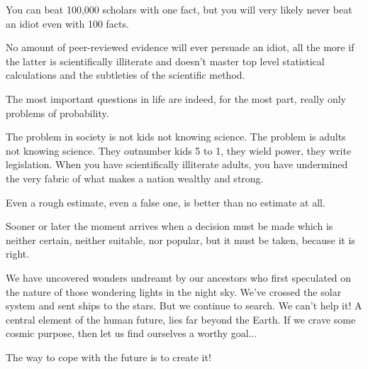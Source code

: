  	\begin{fuquote}[?]You can beat 100,000 scholars with one fact, but you will very likely never beat an idiot even with 100 facts.
 	\end{fuquote}
 	
 	\begin{fuquote}[?]No amount of peer-reviewed evidence will ever persuade an idiot, all the more if the latter is scientifically illiterate and doesn't master top level statistical calculations and the subtleties of the scientific method.
 	\end{fuquote}
 	
 	\begin{fuquote}The most important questions in life are indeed, for the most part, really only problems of probability.
 	\end{fuquote}
 	
 	\begin{fuquote}The problem in society is not kids not knowing science. The problem is adults not knowing science. They outnumber kids 5 to 1, they wield power, they write legislation. When you have scientifically illiterate adults, you have undermined the very fabric of what makes a nation wealthy and strong.
 	\end{fuquote}
 	
 	\begin{fuquote}[?]Even a rough estimate, even a false one, is better than no estimate at all.
 	\end{fuquote}
 	
 	\begin{fuquote}Sooner or later the moment arrives when a decision must be made which is neither certain, neither suitable, nor popular, but it must be taken, because it is right.
 	\end{fuquote}
 	
 	\begin{fuquote}We have uncovered wonders undreamt by our ancestors who first speculated on the nature of those wondering lights in the night sky. We've crossed the solar system and sent ships to the stars. But we continue to search. We can't help it! A central element of the human future, lies far beyond the Earth. If we crave some cosmic purpose, then let us find ourselves a worthy goal...
 	\end{fuquote}
 	
 	\begin{fuquote}The way to cope with the future is to create it!
 	\end{fuquote}
 	
